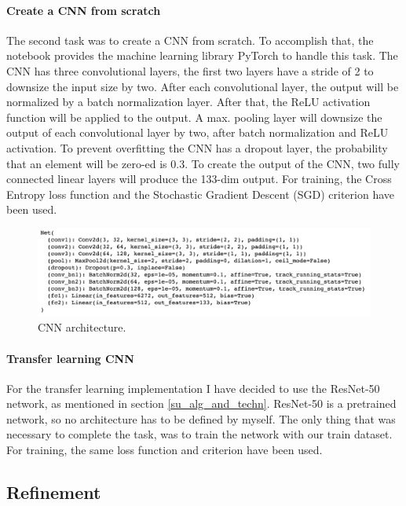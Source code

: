 \documentclass{article}
\begin{document}
\paragraph{Create a CNN from scratch} The second task was to create a CNN from scratch. To accomplish that, the notebook provides the machine learning library PyTorch to handle this task.\newline
The CNN has three convolutional layers, the first two layers have a stride of 2 to downsize the input size by two. After each convolutional layer, the output will be normalized by a batch normalization layer. After that, the ReLU activation function will be applied to the output. A max. pooling layer will downsize the output of each convolutional layer by two, after batch normalization and ReLU activation. To prevent overfitting the CNN has a dropout layer, the probability that an element will be zero-ed is 0.3. To create the output of the CNN, two fully connected linear layers will produce the 133-dim output.\newline
For training, the Cross Entropy loss function and the Stochastic Gradient Descent (SGD) criterion have been used.
\begin{figure}[h]
    \centering
    \includegraphics[scale=0.45]{./images/model_scratch_architecture}
    \caption{CNN architecture.}
    \label{fig:scratch_network_architecture}
\end{figure}

\paragraph{Transfer learning CNN} For the transfer learning implementation I have decided to use the ResNet-50 network, as mentioned in section \ref{su_alg_and_techn}. ResNet-50 is a pretrained network, so no architecture has to be defined by myself. The only thing that was necessary to complete the task, was to train the network with our train dataset. For training, the same loss function and criterion have been used.

\subsection{Refinement} \label{su_refinement}
\end{document}
